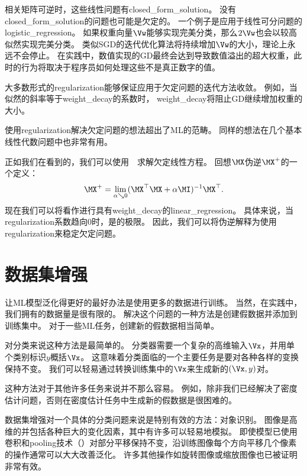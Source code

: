 相关矩阵可逆时，这些线性问题有\gls{closed_form_solution}。
没有\gls{closed_form_solution}的问题也可能是欠定的。
一个例子是应用于线性可分问题的\gls{logistic_regression}。
如果权重向量$\Vw$能够实现完美分类，那么$2 \Vw$也会以较高似然实现完美分类。
类似\gls{SGD}的迭代优化算法将持续增加$\Vw$的大小，理论上永远不会停止。
在实践中，数值实现的\gls{GD}最终会达到导致数值溢出的超大权重，此时的行为将取决于程序员如何处理这些不是真正数字的值。

大多数形式的\gls{regularization}能够保证应用于欠定问题的迭代方法收敛。
例如，当似然的斜率等于\gls{weight_decay}的系数时， \gls{weight_decay}将阻止\gls{GD}继续增加权重的大小。

使用\gls{regularization}解决欠定问题的想法超出了\gls{ML}的范畴。
同样的想法在几个基本线性代数问题中也非常有用。


正如我们在看到的，我们可以使用~~求解欠定线性方程。 
回想$\MX$伪逆$\MX^+$的一个定义：
\begin{align} 
\label{eq:729pseudo}
 \MX^+ = \lim_{\alpha \searrow 0} (\MX^\top \MX + \alpha \MI)^{-1}\MX^\top.
\end{align}
现在我们可以将看作进行具有\gls{weight_decay}的\gls{linear_regression}。
具体来说，当\gls{regularization}系数趋向0时，是的极限。
因此，我们可以将伪逆解释为使用\gls{regularization}来稳定欠定问题。


\section{数据集增强}
\label{sec:dataset_augmentation_chap7}
让\gls{ML}模型泛化得更好的最好办法是使用更多的数据进行训练。
当然，在实践中，我们拥有的数据量是很有限的。
解决这个问题的一种方法是创建假数据并添加到训练集中。
对于一些\gls{ML}任务，创建新的假数据相当简单。

对分类来说这种方法是最简单的。
分类器需要一个复杂的高维输入$\Vx$，并用单个类别标识$y$概括$\Vx$。
这意味着分类面临的一个主要任务是要对各种各样的变换保持不变。
我们可以轻易通过转换训练集中的$\Vx$来生成新的$(\Vx, y)$对。

这种方法对于其他许多任务来说并不那么容易。
例如，除非我们已经解决了密度估计问题，否则在密度估计任务中生成新的假数据是很困难的。

数据集增强对一个具体的分类问题来说是特别有效的方法：对象识别。
图像是高维的并包括各种巨大的变化因素，其中有许多可以轻易地模拟。
即使模型已使用卷积和\gls{pooling}技术（）对部分平移保持不变，沿训练图像每个方向平移几个像素的操作通常可以大大改善泛化。
许多其他操作如旋转图像或缩放图像也已被证明非常有效。

